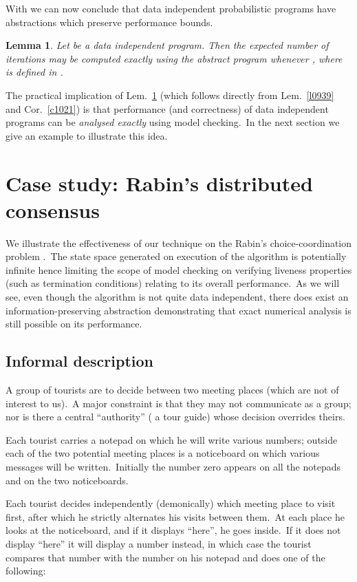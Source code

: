 \documentclass[numbers,copyright,creativecommons]{eptcs}
\newtheorem{Lems}{Lemma} \newcommand{\Lem}[1]{Lem.~\ref{#1}}
\newcommand{\Cor}[1]{Cor.~\ref{#1}}
\begin{document}
 With  we can now conclude that data independent probabilistic programs have abstractions which preserve performance bounds.

 \begin{Lems}\label{l1111}
 Let  be a data independent program. Then the expected number of iterations  may be computed exactly using the abstract program  whenever , where  is defined in .
 \end{Lems}

 The practical implication of \Lem{l1111} (which follows directly from \Lem{l0939} and \Cor{c1021}) is that performance (and correctness) of data independent programs can be \emph{analysed exactly} using  model checking.\ In the next section we give an example to illustrate this idea.



\section{Case study: Rabin's distributed consensus}\label{DC}

We illustrate the effectiveness of our technique on
the Rabin's choice-coordination problem \cite{Rabin82}.\ The state space generated on execution of the algorithm is potentially infinite hence limiting the scope of model checking on verifying liveness properties (such as termination conditions) relating to its overall performance.\ As we will see, even though the algorithm is not quite data independent, there does exist an information-preserving abstraction demonstrating that exact numerical analysis is still possible on its performance.

\subsection{Informal description}
A group of tourists are to decide between two meeting places (which are not of
interest to us).\ A major constraint is that they may not communicate as a group; nor
is there a central ``authority'' ( a tour guide) whose decision overrides theirs.

Each tourist carries a notepad on which he will write various numbers; outside each of
the two potential meeting places is a noticeboard on which various messages will
be written.\ Initially the number zero appears on all the notepads and on the two
noticeboards.

Each tourist decides independently (demonically) which meeting place to visit first, after
which he strictly alternates his visits between them.\ At each place he looks at the
noticeboard, and if it displays ``here'', he goes inside.\ If it does not display ``here''
it will display a number instead, in which case the tourist compares that number  with
the number  on his notepad and does one of the following:
\end{document}
